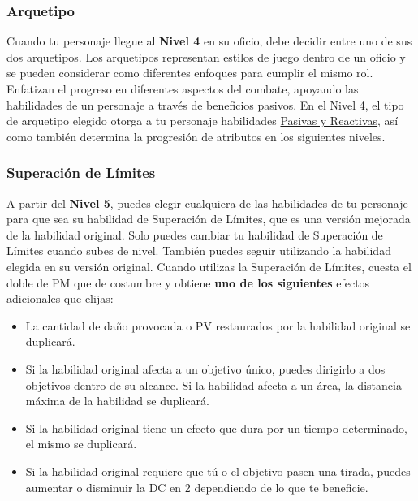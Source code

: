 \subsubsection*{Arquetipo}
Cuando tu personaje llegue al \textbf{Nivel 4} en su oficio, debe decidir entre uno de sus dos arquetipos. Los arquetipos representan estilos de juego dentro de un oficio y se pueden considerar como diferentes enfoques para cumplir el mismo rol. Enfatizan el progreso en diferentes aspectos del combate, apoyando las habilidades de un personaje a través de beneficios pasivos. En el Nivel 4, el tipo de arquetipo elegido otorga a tu personaje habilidades \hyperlink{sabilities}{Pasivas y Reactivas}, así como también determina la progresión de atributos en los siguientes niveles.
%
\pagebreak
%
\subsubsection*{Superación de Límites}
A partir del \textbf{Nivel 5}, puedes elegir cualquiera de las habilidades de tu personaje para que sea su habilidad de Superación de Límites, que es una versión mejorada de la habilidad original. Solo puedes cambiar tu habilidad de Superación de Límites cuando subes de nivel. También puedes seguir utilizando la habilidad elegida en su versión original. Cuando utilizas la Superación de Límites, cuesta el doble de PM que de costumbre y obtiene \textbf{uno de los siguientes} efectos adicionales que elijas:
\begin{itemize}[leftmargin=*]  
	\item La cantidad de daño provocada o PV restaurados por la habilidad original se duplicará.
	\item Si la habilidad original afecta a un objetivo único, puedes dirigirlo a dos objetivos dentro de su alcance. Si la habilidad afecta a un área, la distancia máxima de la habilidad se duplicará.
	\item Si la habilidad original tiene un efecto que dura por un tiempo determinado, el mismo se duplicará. 
	\item Si la habilidad original requiere que tú o el objetivo pasen una tirada, puedes aumentar o disminuir la DC en 2 dependiendo de lo que te beneficie. 
\end{itemize}


